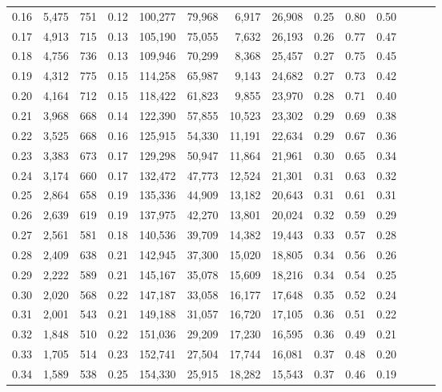 \begin{tabular}{rrrrrrrrrrrrrr}
0.16 &  5,475 &  751 &  0.12 &  100,277 &   79,968 &   6,917 &  26,908 &  0.25 &  0.80 &      0.50 \\
0.17 &  4,913 &  715 &  0.13 &  105,190 &   75,055 &   7,632 &  26,193 &  0.26 &  0.77 &      0.47 \\
0.18 &  4,756 &  736 &  0.13 &  109,946 &   70,299 &   8,368 &  25,457 &  0.27 &  0.75 &      0.45 \\
0.19 &  4,312 &  775 &  0.15 &  114,258 &   65,987 &   9,143 &  24,682 &  0.27 &  0.73 &      0.42 \\
0.20 &  4,164 &  712 &  0.15 &  118,422 &   61,823 &   9,855 &  23,970 &  0.28 &  0.71 &      0.40 \\
0.21 &  3,968 &  668 &  0.14 &  122,390 &   57,855 &  10,523 &  23,302 &  0.29 &  0.69 &      0.38 \\
0.22 &  3,525 &  668 &  0.16 &  125,915 &   54,330 &  11,191 &  22,634 &  0.29 &  0.67 &      0.36 \\
0.23 &  3,383 &  673 &  0.17 &  129,298 &   50,947 &  11,864 &  21,961 &  0.30 &  0.65 &      0.34 \\
0.24 &  3,174 &  660 &  0.17 &  132,472 &   47,773 &  12,524 &  21,301 &  0.31 &  0.63 &      0.32 \\
0.25 &  2,864 &  658 &  0.19 &  135,336 &   44,909 &  13,182 &  20,643 &  0.31 &  0.61 &      0.31 \\
0.26 &  2,639 &  619 &  0.19 &  137,975 &   42,270 &  13,801 &  20,024 &  0.32 &  0.59 &      0.29 \\
0.27 &  2,561 &  581 &  0.18 &  140,536 &   39,709 &  14,382 &  19,443 &  0.33 &  0.57 &      0.28 \\
0.28 &  2,409 &  638 &  0.21 &  142,945 &   37,300 &  15,020 &  18,805 &  0.34 &  0.56 &      0.26 \\
0.29 &  2,222 &  589 &  0.21 &  145,167 &   35,078 &  15,609 &  18,216 &  0.34 &  0.54 &      0.25 \\
0.30 &  2,020 &  568 &  0.22 &  147,187 &   33,058 &  16,177 &  17,648 &  0.35 &  0.52 &      0.24 \\
0.31 &  2,001 &  543 &  0.21 &  149,188 &   31,057 &  16,720 &  17,105 &  0.36 &  0.51 &      0.22 \\
0.32 &  1,848 &  510 &  0.22 &  151,036 &   29,209 &  17,230 &  16,595 &  0.36 &  0.49 &      0.21 \\
0.33 &  1,705 &  514 &  0.23 &  152,741 &   27,504 &  17,744 &  16,081 &  0.37 &  0.48 &      0.20 \\
0.34 &  1,589 &  538 &  0.25 &  154,330 &   25,915 &  18,282 &  15,543 &  0.37 &  0.46 &      0.19 \\

\end{tabular}
